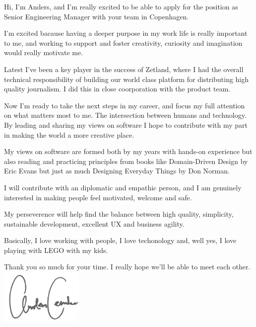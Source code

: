 \documentclass[12pt,a4paper,sans]{moderncv}        %
\begin{document}
\date{\today}
\opening{
  Hi, I'm Anders, and I'm really excited to be able to apply for the position as Senior Engineering Manager with your team in Copenhagen.
}
\makelettertitle

I'm excited bacause having a deeper purpose in my work life is really important to me, and working to support and foster creativity, curiosity and imagination would really motivate me.

Latest I've been a key player in the success of Zetland, where I had the overall technical responsibility of building our world class platform for distributing high quality journalism. I did this in close coorporation with the product team.

Now I'm ready to take the next steps in my career, and focus my full attention on what matters most to me. The intersection between humans and technology. By leading and sharing my views on software I hope to contribute with my part in making the world a more creative place.

My views on software are formed both by my years with hands-on experience but also reading and practicing principles from books like Domain-Driven Design by Eric Evans but just as much Designing Everyday Things by Don Norman.

I will contribute with an diplomatic and empathic person, and I am genuinely interested in making people feel motivated, welcome and safe.

My perseverence will help find the balance between high quality, simplicity, sustainable development, excellent UX and business agility.

Basically, I love working with people, I love techonology and, well yes, I love playing with LEGO with my kids.


\vspace{0.5cm}

\closing{Thank you so much for your time. I really hope we'll be able to meet each other. \\ \vspace{0.5cm} \includegraphics[width=4cm]{underskrift} \vspace{-1.5cm}}

\makeletterclosing
\end{document}
